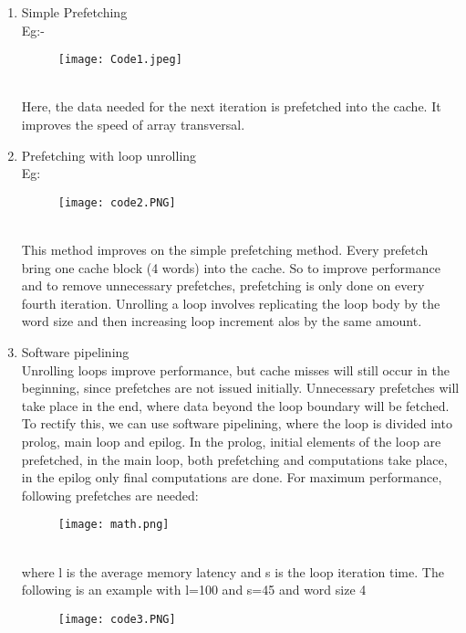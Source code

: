 \documentclass{article}
\begin{document}
    \begin{enumerate}
    	\item Simple Prefetching 
    	\\Eg:-
    \	\begin{figure}[htp]
    \centering
    \texttt{[image: Code1.jpeg]}
    \label{fig:code1}
\end{figure}
\\Here, the data needed for the next iteration is prefetched into the cache. It improves the speed of array transversal.
        \item Prefetching with loop unrolling 
\\Eg: 
\	\begin{figure}[htp]
    \centering
    \texttt{[image: code2.PNG]}
    \label{fig:code2}
\end{figure}
\\This method improves on the simple prefetching method. Every prefetch bring one cache block (4 words) into the cache. So to improve performance and to remove unnecessary prefetches, prefetching is only done on every fourth iteration. Unrolling a loop involves replicating the loop body by the word size and then increasing loop increment alos by the same amount.
  \item Software pipelining
\\Unrolling loops improve performance, but cache misses will still occur in the beginning, since prefetches are not issued initially. Unnecessary prefetches will take place in the end, where data beyond the loop boundary will be fetched. To rectify this, we can use software pipelining, where the loop is divided into prolog, main loop and epilog. In the prolog, initial elements of the loop are prefetched, in the main loop, both prefetching and computations take place, in the epilog only final computations are done. For maximum performance, following prefetches are needed:
\	\begin{figure}[htp]
    \centering
    \texttt{[image: math.png]}
    \label{fig:math}
\end{figure}
\\ where l is the average memory latency and s is the loop iteration time.
The following is an example with l=100 and s=45 and word size 4
\	\begin{figure}[htp]
    \centering
    \texttt{[image: code3.PNG]}
    \label{fig:code3}
\end{figure}
\	\begin{figure}[htp]
    \centering

\end{figure}
\end{enumerate}
\end{document}
